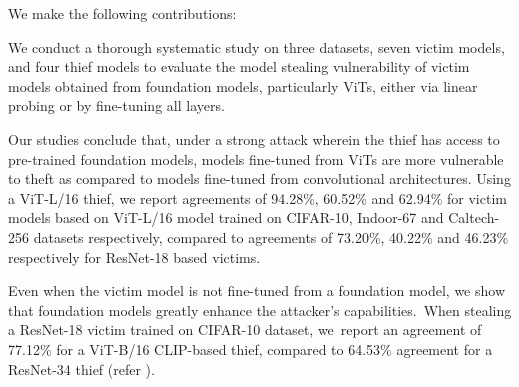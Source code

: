  We make the following contributions:
%
\begin{enumerate*}[label=\textbf{(\arabic*)}]
	\item We conduct a thorough systematic study on three datasets, seven victim models, and four thief models to evaluate the model stealing vulnerability of victim models obtained from foundation models, particularly ViTs, either via linear probing or by fine-tuning all layers.
	\item Our studies conclude that, under a strong attack wherein the thief has access to pre-trained foundation models, models fine-tuned from ViTs are more vulnerable to theft as compared to models fine-tuned from convolutional architectures. Using a ViT-L/16 thief, we report agreements of 94.28\%, 60.52\% and 62.94\% for victim models based on ViT-L/16 model trained on CIFAR-10, Indoor-67 and Caltech-256 datasets respectively, compared to agreements of 73.20\%, 40.22\% and 46.23\% respectively for ResNet-18 based victims.
	\item Even when the victim model is not fine-tuned from a foundation model, we show that foundation models greatly enhance the attacker's capabilities. When stealing a ResNet-18 victim trained on CIFAR-10 dataset, we report an agreement of 77.12\% for a ViT-B/16 CLIP-based thief, compared to 64.53\% agreement for a ResNet-34 thief (refer ).
\end{enumerate*}

